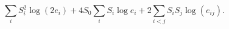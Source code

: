 \begin{equation}
\sum_{i}S_{i}^{2}\log (2e_{i})+4S_{0}\sum_{i}S_{i}\log
e_{i}+2\sum_{i<j}S_{i}S_{j}\log (e_{ij}).
\end{equation}

